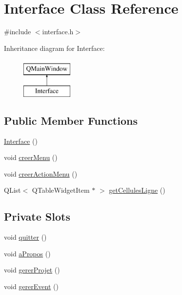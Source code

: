 \hypertarget{class_interface}{}\section{Interface Class Reference}
\label{class_interface}


{\ttfamily \#include $<$interface.\+h$>$}

Inheritance diagram for Interface\+:\begin{figure}[H]
\begin{center}
\leavevmode
\includegraphics[height=2.000000cm]{class_interface}
\end{center}
\end{figure}
\subsection*{Public Member Functions}
\begin{DoxyCompactItemize}
\item 
\hyperlink{class_interface_a4406d74c75bdfe150bf72be1f1cda8b1}{Interface} ()
\item 
void \hyperlink{class_interface_ab16225b70e5b896ce72ff1f635f4ea80}{creer\+Menu} ()
\item 
void \hyperlink{class_interface_a6e75d088bb17b45927e717cfa02efb46}{creer\+Action\+Menu} ()
\item 
Q\+List$<$ Q\+Table\+Widget\+Item $\ast$ $>$ \hyperlink{class_interface_ad79d4272b59a608ae0c0b48692bdc0fc}{get\+Cellules\+Ligne} ()
\end{DoxyCompactItemize}
\subsection*{Private Slots}
\begin{DoxyCompactItemize}
\item 
void \hyperlink{class_interface_adba89efb181d1e4bc73b1fcaf19da136}{quitter} ()
\item 
void \hyperlink{class_interface_aa1740b524bd3d5a616c3da169b21bbe2}{a\+Propos} ()
\item 
void \hyperlink{class_interface_a2453496cddd1a8f8935c4cee547535b8}{gerer\+Projet} ()
\item 
void \hyperlink{class_interface_a7e65fe818b99979831ea4aea34ce1222}{gerer\+Event} ()
\end{DoxyCompactItemize}
